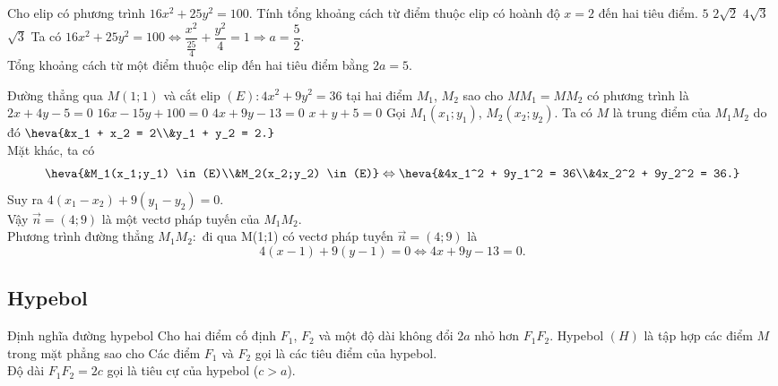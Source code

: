 \begin{ex}%
	Cho elip có phương trình $16x^2 + 25y^2 = 100$. Tính tổng khoảng cách từ điểm thuộc elip có hoành độ $x = 2$ đến hai tiêu điểm.
	\choice
	{\True $5$}
	{$2\sqrt{2}$}
	{$4\sqrt{3}$}
	{$\sqrt{3}$}
	\loigiai
	{
		Ta có $16x^2 + 25y^2 = 100 \Leftrightarrow \dfrac{x^2}{\tfrac{25}{4}} + \dfrac{y^2}{4} = 1 \Rightarrow a = \dfrac{5}{2}$.\\
		Tổng khoảng cách từ một điểm thuộc elip đến hai tiêu điểm bằng $2a = 5$.
	}
\end{ex}

\begin{ex}%
	Đường thẳng qua $M(1;1)$ và cắt elip $(E)\colon 4x^2 + 9y^2 = 36$ tại hai điểm $M_1$, $M_2$ sao cho $MM_1 = MM_2$ có phương trình là 
	\choice
	{$2x + 4y - 5 = 0$}
	{$16x - 15y + 100 = 0$}
	{\True $4x + 9y - 13 = 0$}
	{$x + y + 5 = 0$}
	\loigiai
	{
		Gọi $M_1(x_1;y_1)$, $M_2(x_2;y_2)$. Ta có $M$ là trung điểm của $M_1M_2$ do đó $\heva{&x_1 + x_2 = 2\\&y_1 + y_2 = 2.}$\\
		Mặt khác, ta có
		$$ \heva{&M_1(x_1;y_1) \in (E)\\&M_2(x_2;y_2) \in (E)} \Leftrightarrow \heva{&4x_1^2 + 9y_1^2 = 36\\&4x_2^2 + 9y_2^2 = 36.} $$
		Suy ra $4(x_1 - x_2) + 9(y_1 - y_2) = 0$.\\
		Vậy $\overrightarrow{n} = (4;9)$ là một vectơ pháp tuyến của $M_1M_2$.\\
		Phương trình đường thẳng $M_1M_2\colon$ đi qua M(1;1) có vectơ pháp tuyến $\overrightarrow{n} = (4;9)$ là
		$$ 4(x - 1) + 9(y - 1) = 0 \Leftrightarrow 4x + 9y - 13 = 0. $$
	}
\end{ex}


\subsection{Hypebol}
\begin{khung4}{Định nghĩa đường hypebol}
	Cho hai điểm cố định $F_1$, $F_2$ và một độ dài không đổi $2a$ nhỏ hơn $F_1 F_2$. Hypebol $(H)$ là tập hợp các điểm $M$ trong mặt phẳng sao cho 
Các điểm $F_1$ và $F_2$ gọi là các tiêu điểm của hypebol.\\
Độ dài $F_1F_2 = 2c$ gọi là tiêu cự của hypebol ($c > a$).\\
\end{khung4}

